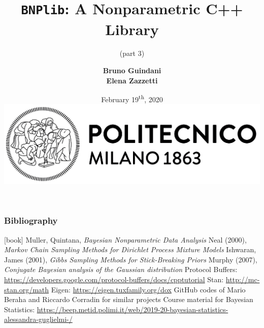 \documentclass{beamer}
\title[BNPlib]{\textbf{\texttt{BNPlib}: A Nonparametric C++ Library}}
\subtitle{(part 3)}
\author[Guindani, Zazzetti]{\textbf{Bruno Guindani \\ Elena Zazzetti}}
\institute[PoliMi]{}
\date[2020/02/19]{
	February 19\textsuperscript{th}, 2020 \\[15pt]
	\includegraphics[scale=.35]{../etc/logo_long.jpg}
}
\begin{document}





\begin{frame}
	\small
	\frametitle{Bibliography}
	\begin{thebibliography}{9}
		 Muller, Quintana, \textit{Bayesian Nonparametric Data Analysis}
		 Neal (2000), \textit{Markov Chain Sampling Methods for Dirichlet Process Mixture Models}
		 Ishwaran, James (2001), \textit{Gibbs Sampling Methods for Stick-Breaking Priors}
		 Murphy (2007), \textit{Conjugate Bayesian analysis of the Gaussian distribution}
		 Protocol Buffers: \url{https://developers.google.com/protocol-buffers/docs/cpptutorial}
		 Stan: \url{http://mc-stan.org/math}
		 Eigen: \url{https://eigen.tuxfamily.org/dox}
		 GitHub codes of Mario Beraha and Riccardo Corradin for similar projects
		 Course material for Bayesian Statistics: \url{https://beep.metid.polimi.it/web/2019-20-bayesian-statistics-alessandra-guglielmi-/}
	\end{thebibliography}
\end{frame}
\end{document}

